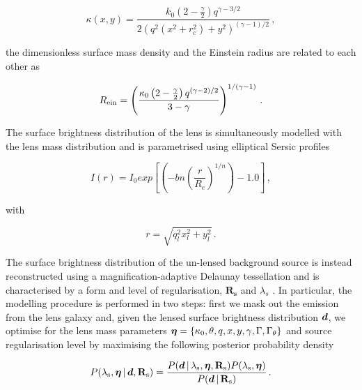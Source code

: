 \documentclass[a4paper,fleqn,usenatbib]{mnras}
\begin{document}
\begin{equation}\label{massdensity}
\kappa\left ( x,y \right ) = \frac{k_0 \left ( 2 - \frac{\gamma}{2} \right ) q^{\gamma - 3/2}}{2 \left ( q^2 \left ( x^2 + r_c^2 \right ) + y^2\right )^{\left ( \gamma - 1 \right )/2}}\,, 
\end{equation}

the dimensionless surface mass density and the Einstein radius are related to each other as

\begin{equation}\label{einsteinradius}
R_{\rm{ein}} = \left ( \frac{\kappa_0 \left ( 2 - \frac{\gamma}{2} \right ) q^{\left ( \gamma - 2 \right )/2}}{3 - \gamma} \right )^{1/\left ( \gamma - 1 \right )}\,.
\end{equation}

The surface brightness distribution of the lens is simultaneously modelled with the lens mass distribution and is parametrised using elliptical Sersic profiles 

\begin{equation}
I \left ( r \right ) = I_0 exp \left [  \left (  - bn  \left (  \frac{r}{R_e} \right ) ^ {1/n} \right )  - 1.0   \right ]\,,
\end{equation}

with

\begin{equation}
r = \sqrt{q_l^2  x_l ^2 + y_l ^2}\,.
\end{equation}

The surface brightness distribution of the un-lensed background source is instead reconstructed using a magnification-adaptive Delaunay tessellation and is characterised by a form and level of regularisation,  $\mathbf{R_s}$ and $\lambda_s$ \citep[see][for a more detailed description]{V09,V14a}.  In particular, the modelling procedure is performed in two steps: first we mask out the emission from the lens galaxy and, given the lensed surface brightness distribution $\bmath d$, we optimise for the lens mass parameters $\bmath \eta = \{\kappa_0,\theta,q,x,y,\gamma,\Gamma,\Gamma_{\theta}\}$ and source regularisation level by maximising the following posterior probability density 

\begin{equation}\label{equ:posterior}
    P(\lambda_{\rm{s}},\bmath \eta\,|\,\bmath d,\mathbf
      R_{\rm{s}})=\frac{P(\bmath d\,|\,\lambda_{\rm{s}},\bmath \eta,\mathbf
      R_{\rm{s}})P(\lambda_{\rm{s}},\bmath \eta)}{P(\bmath d\,|\,\mathbf
      R_{\rm{s}})}\,.
\end{equation}
\end{document}
